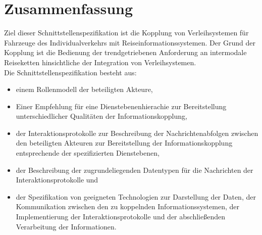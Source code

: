 \chapter{Zusammenfassung}
\label{sec:Zusammenfassung}

Ziel dieser Schnittstellenspezifikation ist die Kopplung von Verleihsystemen für Fahrzeuge des Individualverkehrs mit Reiseinformationssystemen. Der Grund der Kopplung ist die Bedienung der trendgetriebenen Anforderung an intermodale Reiseketten hinsichtliche der Integration von Verleihsystemen.\\

Die Schnittstellenspezifikation besteht aus:\begin{itemize}
\item einem Rollenmodell der beteiligten Akteure, 
\item Einer Empfehlung für eine Dienstebenenhierachie zur Bereitstellung unterschiedlicher Qualitäten der Informationskopplung, 
\item der Interaktionsprotokolle zur Beschreibung der Nachrichtenabfolgen zwischen den beteiligten Akteuren zur Bereitstellung der Informationskopplung entsprechende der spezifizierten Dienstebenen,
\item der Beschreibung der zugrundeliegenden Datentypen für die Nachrichten der Interaktionsprotokolle und
\item der Spezifikation von geeigneten Technologien zur Darstellung der Daten, der Kommunikation zwischen den zu koppelnden Informationssystemen, der Implementierung der Interaktionsprotokolle und der abschließenden Verarbeitung der Informationen.
\end{itemize}
